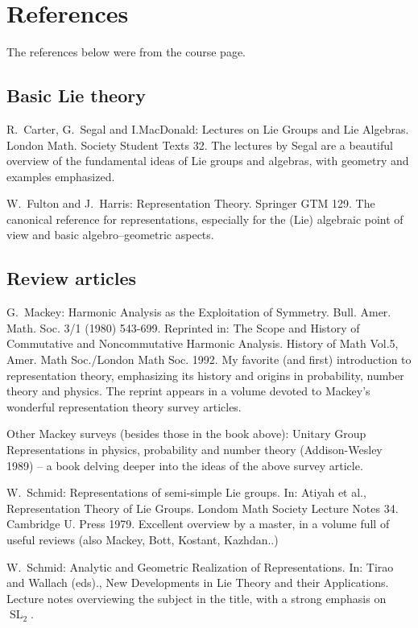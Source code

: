 \documentclass[11pt,leqno]{article}
\theoremstyle{plain}
\theoremstyle{definition}
\numberwithin{equation}{section}
\numberwithin{lem}{section}
\DeclareMathOperator{\SL}{SL}
\begin{document}
\newpage\section*{References}
The references below were from the course page.
{\footnotesize
\subsection*{\hspace{1em}Basic Lie theory}
 R.~Carter, G.~Segal and I.MacDonald: Lectures on Lie Groups and Lie Algebras. London Math. Society Student Texts 32. The lectures by Segal are a beautiful overview of the fundamental ideas of Lie groups and algebras, with geometry and examples emphasized.

W.~Fulton and J.~Harris: Representation Theory. Springer GTM 129. The canonical reference for representations, especially for the (Lie) algebraic point of view and basic algebro--geometric aspects.
\subsection*{\hspace{1em}Review articles}
G.~Mackey: Harmonic Analysis as the Exploitation of Symmetry. Bull. Amer. Math. Soc. 3/1 (1980) 543-699. Reprinted in: The Scope and History of Commutative and Noncommutative Harmonic Analysis. History of Math Vol.5, Amer. Math Soc./London Math Soc. 1992. My favorite (and first) introduction to representation theory, emphasizing its history and origins in probability, number theory and physics. The reprint appears in a volume devoted to Mackey's wonderful representation theory survey articles.

Other Mackey surveys (besides those in the book above): Unitary Group Representations in physics, probability and number theory (Addison-Wesley 1989) -- a book delving deeper into the ideas of the above survey article.

W.~Schmid: Representations of semi-simple Lie groups. In: Atiyah et al., Representation Theory of Lie Groups. Londom Math Society Lecture Notes 34. Cambridge U. Press 1979. Excellent overview by a master, in a volume full of useful reviews (also Mackey, Bott, Kostant, Kazhdan..)

W.~Schmid: Analytic and Geometric Realization of Representations. In: Tirao and Wallach (eds)., New Developments in Lie Theory and their Applications. Lecture notes overviewing the subject in the title, with a strong emphasis on $\SL_2$.

}
\end{document}
